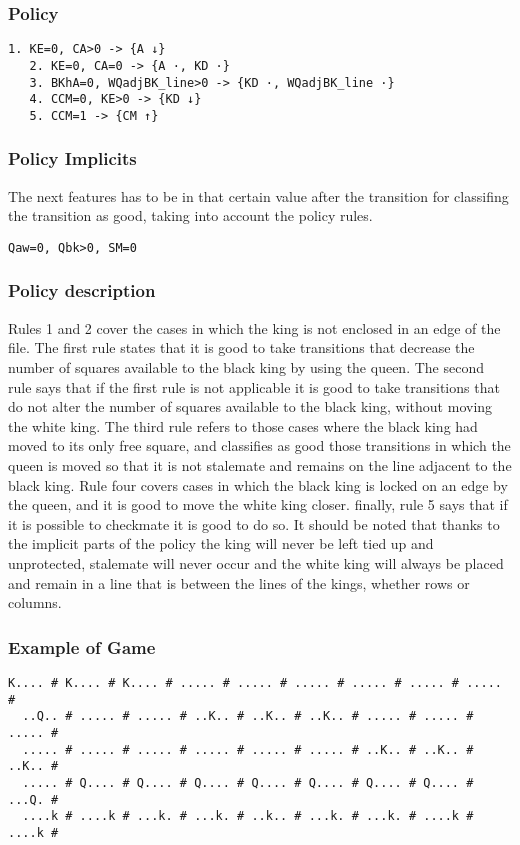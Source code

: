 \documentclass[a4paper]{article}
\begin{document}
\subsubsection{Policy}
  \begin{Verbatim}[fontsize=\footnotesize]
   1. KE=0, CA>0 -> {A ↓}
   2. KE=0, CA=0 -> {A ·, KD ·}
   3. BKhA=0, WQadjBK_line>0 -> {KD ·, WQadjBK_line ·}
   4. CCM=0, KE>0 -> {KD ↓}
   5. CCM=1 -> {CM ↑}
  \end{Verbatim}


\subsubsection{Policy Implicits}
The next features has to be in that certain value after the transition for classifing the transition as good, taking into account the policy rules.
  \begin{Verbatim}[fontsize=\footnotesize]
   Qaw=0, Qbk>0, SM=0
  \end{Verbatim}


\subsubsection{Policy description}
Rules 1 and 2 cover the cases in which the king is not enclosed in an edge of the file. The first rule states that it is good to take transitions that decrease the number of squares available to the black king by using the queen. The second rule says that if the first rule is not applicable it is good to take transitions that do not alter the number of squares available to the black king, without moving the white king. The third rule refers to those cases where the black king had moved to its only free square, and classifies as good those transitions in which the queen is moved so that it is not stalemate and remains on the line adjacent to the black king. Rule four covers cases in which the black king is locked on an edge by the queen, and it is good to move the white king closer. finally, rule 5 says that if it is possible to checkmate it is good to do so. It should be noted that thanks to the implicit parts of the policy the king will never be left tied up and unprotected, stalemate will never occur and the white king will always be placed and remain in a line that is between the lines of the kings, whether rows or columns.


\subsubsection{Example of Game}
\begin{Verbatim}[fontsize=\footnotesize]
  K.... # K.... # K.... # ..... # ..... # ..... # ..... # ..... # ..... #
  ..Q.. # ..... # ..... # ..K.. # ..K.. # ..K.. # ..... # ..... # ..... #
  ..... # ..... # ..... # ..... # ..... # ..... # ..K.. # ..K.. # ..K.. #
  ..... # Q.... # Q.... # Q.... # Q.... # Q.... # Q.... # Q.... # ...Q. #
  ....k # ....k # ...k. # ...k. # ..k.. # ...k. # ...k. # ....k # ....k #
\end{Verbatim}
\end{document}
